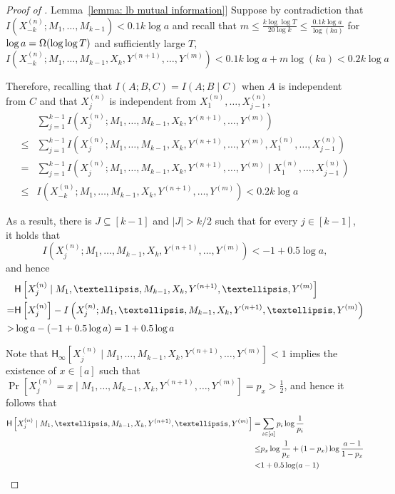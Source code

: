 \documentclass[11pt]{article}
\numberwithin{equation}{section}
\theoremstyle{definition}
\theoremstyle{plain}
\newcommand{\expref}[2]{\hyperref[#2]{#1~\ref{#2}}}
\newcommand{\cond}{\;|\;}
\newcommand{\entropy}{\ensuremath{\mathsf{H}}}
\newcommand{\Hmin}{\ensuremath{\mathsf{H}_{\infty}}}
\begin{document}
\begin{proof}[Proof of \expref{Lemma}{lemma: lb mutual information}]
		Suppose  by contradiction that
		$I\left(X^{(n)}_{-k}; M_1,\ldots, M_{k-1}\right)<0.1 k\log a$ and recall that $m \le\frac{k\log\log T}{20\log k} \le\frac{0.1 k\log a}{\log (ka)}$ for ${\color{black}\log a=\Omega(\log \log T)}$ and sufficiently large $T$,
		$$ I\left(X^{(n)}_{-k}; M_1,\ldots, M_{k-1}, X_k, Y^{(n+1)},\ldots, Y^{(m)} \right)<0.1 k\log a + {m\log(ka)}<0.2 k\log a$$

		Therefore, recalling that $I(A;B,C)=I(A;B\cond C)$ when $A$ is independent from $C$ and that $X_j^{(n)}$ is independent from $X^{(n)}_1,\ldots, X^{(n)}_{j-1}$, 
		\begin{align*}
			& \sum_{j=1}^{k-1} I\left(X^{(n)}_{j}; M_1,\ldots, M_{k-1}, X_k, Y^{(n+1)},\ldots, Y^{(m)} \right) \\
			\le & \sum_{j=1}^{k-1} I\left(X^{(n)}_{j}; M_1,\ldots, M_{k-1}, X_k, Y^{(n+1)},\ldots, Y^{(m)}, X^{(n)}_1,\ldots, X^{(n)}_{j-1} \right) \\
			= & \sum_{j=1}^{k-1} I\left(X^{(n)}_{j}; M_1,\ldots, M_{k-1}, X_k, Y^{(n+1)},\ldots, Y^{(m)} \cond X^{(n)}_1,\ldots, X^{(n)}_{j-1} \right)\\
			\le & I(X^{(n)}_{-k}; M_1,\ldots, M_{k-1}, X_k, Y^{(n+1)},\ldots, Y^{(m)} ) <0.2 k\log a
		\end{align*}
		
		As a result, there is $J\subseteq [k-1]$ and $|J|>k/2$ such that for every $j\in [k-1]$, it holds that
		$$I\left(X^{(n)}_{j}; M_1,\ldots, M_{k-1}, X_k, Y^{(n+1)},\ldots, Y^{(m)} \right)<-1+ 0.5\log a,$$
		and hence 
		\begin{align}
			&\entropy\left[X^{(n)}_{j} \cond M_1,\ldots, M_{k-1}, X_k, Y^{(n+1)},\ldots, Y^{(m)} \right] \notag\\
			= &\entropy\left[X^{(n)}_{j}\right] -  I\left(X^{(n)}_{j}; M_1,\ldots, M_{k-1}, X_k, Y^{(n+1)},\ldots, Y^{(m)} \right)\notag\\
			>& \log a - (-1+ 0.5\log a) = 1+ 0.5\log a \label{ineq:lower bound for H}
		\end{align}
	
		Note that
		$\Hmin\left[X^{(n)}_{j} \cond M_1,\ldots, M_{k-1}, X_k, Y^{(n+1)},\ldots, Y^{(m)} \right] <1$ implies the existence of $x\in [a]$ such that  $\Pr\left[X^{(n)}_{j}=x \cond M_1,\ldots, M_{k-1}, X_k, Y^{(n+1)},\ldots, Y^{(m)} \right]=p_x>\frac{1}{2}$,
		and hence it follows that 
		\begin{align}
			\entropy\left[X^{(n)}_{j} \cond M_1,\ldots, M_{k-1}, X_k, Y^{(n+1)},\ldots, Y^{(m)} \right] 
			=& \sum_{i\in[a]} p_i\log\frac{1}{p_i} \notag \\
			\le & p_x\log \frac{1}{p_x}+(1-p_x)\log\frac{a-1}{1-p_x}\notag\\
			< & 1+0.5\log (a-1) \label{ineq:upper bound for H}
		\end{align}


\end{proof}
\end{document}

